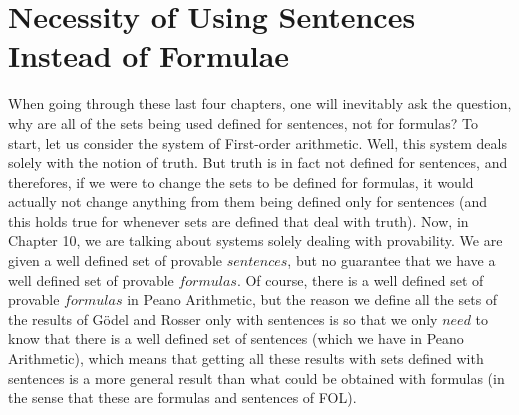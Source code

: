 \documentclass{article}
\theoremstyle{definition}
\begin{document}
\section*{Necessity of Using Sentences Instead of Formulae}
When going through these last four chapters, one will inevitably ask the question, why are all of the sets being used defined for sentences, not for 
formulas? To start, let us consider the system of First-order arithmetic. Well, this system deals solely with the notion of truth. But truth is in fact 
not defined for sentences, and therefores, if we were to change the sets to be defined for formulas, it would actually not change anything from them 
being defined only for sentences (and this holds true for whenever sets are defined that deal with truth). Now, in Chapter 10, we are talking about 
systems solely dealing with provability. We are given a well defined set of provable $sentences$, but no guarantee that we have a well defined set of 
provable $formulas$. Of course, there is a well defined set of provable $formulas$ in Peano Arithmetic, but the reason we define all the sets of the 
results of Gödel and Rosser only with sentences is so that we only $need$ to know that there is a well defined set of sentences (which we have in Peano 
Arithmetic), which means that getting all these results with sets defined with sentences is a more general result than what could be obtained with 
formulas (in the sense that these are formulas and sentences of FOL). 
\end{document}
